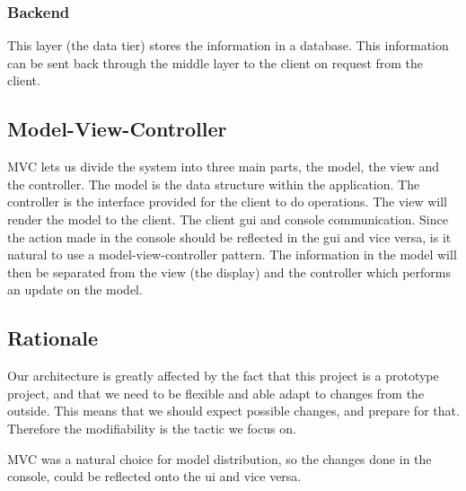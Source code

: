 \subsubsection{Backend}
This layer (the data tier) stores the information in a database. This information can be sent back through the middle layer to the client on request from the client. 


\subsection{Model-View-Controller}
MVC lets us divide the system into three main parts, the model, the view and the controller. The model is the data structure within the application. The controller is the interface provided for the client to do operations. The view will render the model to the client. 
The client gui and console communication. Since the action made in the console should be reflected in the gui and vice versa, is it natural to use a model-view-controller pattern. The information in the model will then be separated from the view (the display) and the controller which performs an update on the model. 


\subsection{Rationale} \label{Rationale}
Our architecture is greatly affected by the fact that this project is a prototype project, and that we need to be flexible and able adapt to changes from the outside. This means that we should expect possible changes, and prepare for that. Therefore the modifiability is the tactic we focus on.

MVC was a natural choice for model distribution, so the changes done in the console, could be reflected onto the ui and vice versa. 
